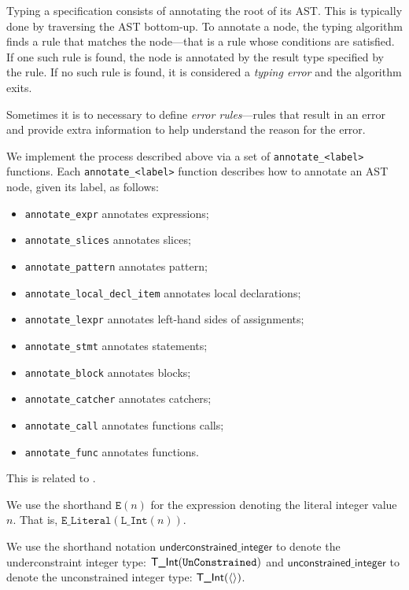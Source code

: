 \documentclass{book}
\newcommand\underconstrainedinteger[0]{\textsf{underconstrained\_integer}}
\newcommand\unconstrainedinteger[0]{\textsf{unconstrained\_integer}}
\begin{document}
Typing a specification consists of annotating the root of its AST. This is typically
done by traversing the AST bottom-up.  To annotate a node, the typing algorithm
finds a rule that matches the node---that is a rule whose conditions are
satisfied. If one such rule is found, the node is annotated by the result type
specified by the rule.  If no such rule is found, it is considered a \emph{typing error}
and the algorithm exits.

Sometimes it is to necessary to define \emph{error rules}---rules that result
in an error and provide extra information to help understand the reason for the
error.

We implement the process described above via a set of
\texttt{annotate\_<label>} functions. Each \texttt{annotate\_<label>}
function describes how to annotate an AST node, given its label, as follows:\begin{itemize}
\item \texttt{annotate\_expr} annotates expressions;
\item \texttt{annotate\_slices} annotates slices;
\item \texttt{annotate\_pattern} annotates pattern;
\item \texttt{annotate\_local\_decl\_item} annotates local declarations;
\item \texttt{annotate\_lexpr} annotates left-hand sides of assignments;
\item \texttt{annotate\_stmt} annotates statements;
\item \texttt{annotate\_block} annotates blocks;
\item \texttt{annotate\_catcher} annotates catchers;
\item \texttt{annotate\_call} annotates functions calls;
\item \texttt{annotate\_func} annotates functions.
\end{itemize}

This is related to .



\newcommand\Elit[1]{\texttt{E}(#1)}
We use the shorthand $\Elit{n}$ for the expression denoting the literal integer value $n$. That is, $\texttt{E\_Literal}(\texttt{L\_Int}(n))$.

We use the shorthand notation $\underconstrainedinteger$ to denote the underconstraint integer type: $\textsf{T\_Int}(\texttt{UnConstrained})$
and $\unconstrainedinteger$ to denote the unconstrained integer type: $\textsf{T\_Int}(\langle\rangle)$.
\end{document}
